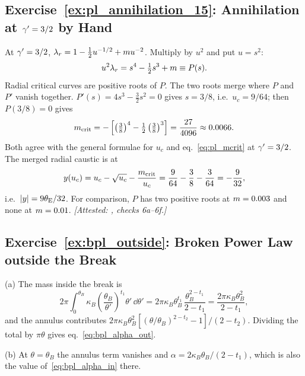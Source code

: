 \subsection*{Exercise~\ref{ex:pl_annihilation_15}: Annihilation at $\gamma'=3/2$ by Hand}

At $\gamma'=3/2$, $\lambda_r=1-\tfrac12u^{-1/2}+m u^{-2}$.  Multiply by
$u^2$ and put $u=s^2$:
\begin{equation*}
    u^2\lambda_r=s^4-\tfrac12 s^3+m\equiv P(s) .
\end{equation*}
Radial critical curves are positive roots of $P$.  The two roots merge
where $P$ and $P'$ vanish together.  $P'(s)=4s^3-\tfrac32 s^2=0$ gives
$s=3/8$, i.e.\ $u_c=9/64$; then $P(3/8)=0$ gives
\begin{equation*}
    m_{\rm crit}=-\left[\left(\tfrac38\right)^4-\tfrac12\left(\tfrac38\right)^3\right]
    =\frac{27}{4096}\approx0.0066 .
\end{equation*}
Both agree with the general formulae for $u_c$ and
eq.~\eqref{eq:pl_mcrit} at $\gamma'=3/2$.  The merged radial caustic is at
\begin{equation*}
    y(u_c)=u_c-\sqrt{u_c}-\frac{m_{\rm crit}}{u_c}
    =\frac{9}{64}-\frac{3}{8}-\frac{3}{64}=-\frac{9}{32} ,
\end{equation*}
i.e.\ $|y|=9\theta_{\mathrm{E}}/32$.  For comparison, $P$ has two positive
roots at $m=0.003$ and none at $m=0.01$.
\emph{[Attested: , checks 6a--6f.]}

\subsection*{Exercise~\ref{ex:bpl_outside}: Broken Power Law outside the Break}

(a) The mass inside the break is
\begin{equation*}
    2\pi\int_0^{\theta_B}\kappa_B\left(\frac{\theta_B}{\theta'}\right)^{t_1}\theta'\,\dd\theta'
    =2\pi\kappa_B\theta_B^{t_1}\,\frac{\theta_B^{2-t_1}}{2-t_1}
    =\frac{2\pi\kappa_B\theta_B^2}{2-t_1} ,
\end{equation*}
and the annulus contributes
$2\pi\kappa_B\theta_B^2[(\theta/\theta_B)^{2-t_2}-1]/(2-t_2)$.  Dividing
the total by $\pi\theta$ gives eq.~\eqref{eq:bpl_alpha_out}.

(b) At $\theta=\theta_B$ the annulus term vanishes and
$\alpha=2\kappa_B\theta_B/(2-t_1)$, which is also the value
of~\eqref{eq:bpl_alpha_in} there.

